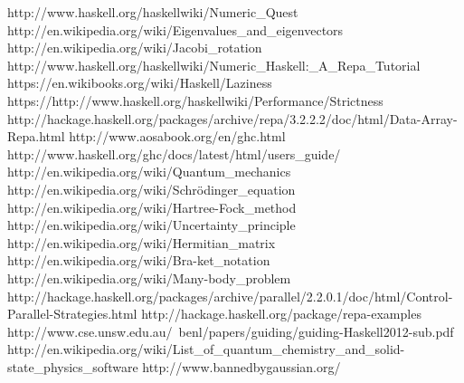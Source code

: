 \documentclass{tmr}
\begin{document}
\begin{thebibliography}{12}

  http://www.haskell.org/haskellwiki/Numeric\_Quest
  http://en.wikipedia.org/wiki/Eigenvalues\_and\_eigenvectors
 http://en.wikipedia.org/wiki/Jacobi\_rotation
 http://www.haskell.org/haskellwiki/Numeric\_Haskell:\_A\_Repa\_Tutorial
  https://en.wikibooks.org/wiki/Haskell/Laziness
  https://http://www.haskell.org/haskellwiki/Performance/Strictness
  http://hackage.haskell.org/packages/archive/repa/3.2.2.2/doc/html/Data-Array-Repa.html
  http://www.aosabook.org/en/ghc.html
  http://www.haskell.org/ghc/docs/latest/html/users\_guide/
 http://en.wikipedia.org/wiki/Quantum\_mechanics
  http://en.wikipedia.org/wiki/Schr\"{o}dinger\_equation
  http://en.wikipedia.org/wiki/Hartree-Fock\_method  
  http://en.wikipedia.org/wiki/Uncertainty\_principle
  http://en.wikipedia.org/wiki/Hermitian\_matrix
  http://en.wikipedia.org/wiki/Bra-ket\_notation
  http://en.wikipedia.org/wiki/Many-body\_problem
  http://hackage.haskell.org/packages/archive/parallel/2.2.0.1/doc/html/Control-Parallel-Strategies.html
  http://hackage.haskell.org/package/repa-examples
  http://www.cse.unsw.edu.au/~benl/papers/guiding/guiding-Haskell2012-sub.pdf
  http://en.wikipedia.org/wiki/List\_of\_quantum\_chemistry\_and\_solid-state\_physics\_software
  http://www.bannedbygaussian.org/





\end{thebibliography}
\end{document}
